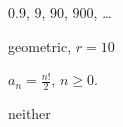 \documentclass{ximera}
\begin{document}
\begin{question}
\begin{problem}
     $0.9$, $9$, $90$, $900$, \ldots

     \begin{solution}
         geometric, $r = 10$
     \end{solution}
\end{problem}

\begin{problem}\label{alggeoneithlast}
    $a_{n} = \frac{n!}{2}$, $n \geq 0$.

    \begin{solution}
        neither
    \end{solution}
\end{problem}


\end{question}
\end{document}
